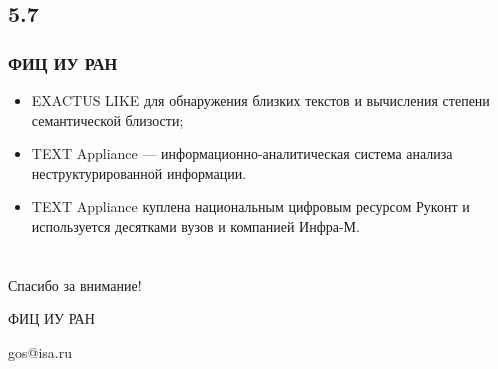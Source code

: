 \documentclass[default]{beamer}
\begin{document}
	\subsection{5.7}
	\begin{frame}
		\frametitle{ФИЦ ИУ РАН}
		
		\begin{itemize}
			\item EXACTUS LIKE для обнаружения близких текстов и вычисления степени семантической близости;
			\item TEXT Appliance --- информационно-аналитическая система анализа неструктурированной информации.
			\item TEXT Appliance куплена национальным цифровым ресурсом  Руконт и используется  десятками вузов и компанией Инфра-М.
		\end{itemize}
	\end{frame}

	\section*{}
	{
	\begin{frame}
		\centering
		\Huge
		Спасибо за внимание!
		\normalsize
		\par\bigskip
		\par\bigskip
		ФИЦ ИУ РАН
		
		\par\bigskip
		gos@isa.ru
	\end{frame}			
	}
\end{document}
